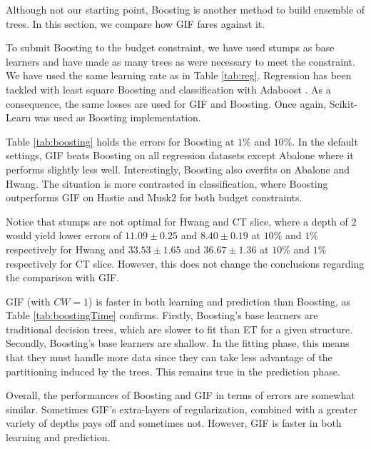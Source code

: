 \documentclass{article}
\begin{document}
Although not our starting point, Boosting is another method to build ensemble 
of trees. In this section, we compare how GIF fares against it. 

To submit Boosting to the budget constraint, we have used stumps as base
learners and have made as many trees as were necessary to meet the constraint.
We have used the same learning rate as in Table \ref{tab:reg}. Regression has
been tackled with least square Boosting \cite{hastie2009} and classification
with Adaboost \cite{adaboost}. As a consequence, the same losses are used for
GIF and Boosting. Once again, Scikit-Learn was used as Boosting implementation.


Table \ref{tab:boosting} holds the errors for Boosting at $1\%$ and $10\%$. In 
the default settings, GIF beats Boosting on all regression datasets except 
Abalone where it performs slightly less well. Interestingly, Boosting also 
overfits on Abalone and Hwang. The situation is more contrasted in 
classification, where Boosting outperforms GIF on Hastie and Musk2 for both 
budget constraints.

Notice that stumps are not optimal for Hwang and CT slice, where a depth of $2$ 
would yield lower errors of $11.09 \pm 0.25$ and $8.40 \pm 0.19$ at $10\%$ and 
$1\%$ respectively for Hwang and $33.53 \pm 1.65$ and $36.67 \pm 1.36$ at 
$10\%$ and $1\%$ respectively for CT slice. However, this does not change the 
conclusions regarding the comparison with GIF.

GIF (with $CW=1$) is faster in both learning and prediction than Boosting, as 
Table \ref{tab:boostingTime} confirms. Firstly, Boosting's base learners are 
traditional decision trees, which are slower to fit than ET for a given 
structure. Secondly, Boosting's base learners are shallow. In the fitting 
phase, this means that they must handle more data since they can take less 
advantage of the partitioning induced by the trees. This remains true in the 
prediction phase.

Overall, the performances of Boosting and GIF in terms of errors are somewhat 
similar. Sometimes GIF's extra-layers of regularization, combined with a 
greater variety of depths pays off and sometimes not. However, GIF is faster in 
both learning and prediction.
\end{document}

